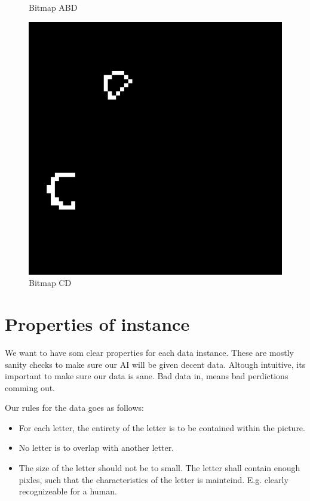 \begin{figure}[!htb]
      \caption{Bitmap ABD}
      \label{Bitmap-highvar-ABD}
    \endminipage\hfill
      \includegraphics[width=\linewidth]{figures/Bitmap-highvar-CD}
      \caption{Bitmap CD} 
      \label{Bitmap-highvar-CD}
    \endminipage
\end{figure}


\section{Properties of instance}
We want to have som clear properties for each data instance. These are mostly sanity checks to make sure
our AI will be given decent data. Altough intuitive, its important to make sure our data is sane. 
Bad data in, means bad perdictions comming out. 

Our rules for the data goes as follows:
\begin{itemize}
    \item For each letter, the entirety of the letter is to be contained within the picture. 
    \item No letter is to overlap with another letter. 
    \item The size of the letter should not be to small. The letter shall contain enough pixles, such that the characteristics of the letter is mainteind. E.g. clearly recognizeable for a human.
  \end{itemize}


